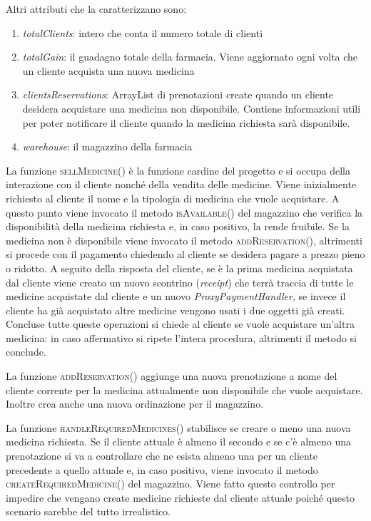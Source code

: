 \documentclass[a4paper, 10pt]{report}
\begin{document}
Altri attributi che la caratterizzano sono:
\begin{enumerate}
\item \textit{totalClients}: intero che conta il numero totale di clienti
\item \textit{totalGain}: il guadagno totale della farmacia. Viene aggiornato ogni volta che un cliente acquista una nuova medicina
\item \textit{clientsReservations}: ArrayList di prenotazioni create quando un cliente desidera acquistare una medicina non disponibile. Contiene informazioni utili per poter notificare il cliente quando la medicina richiesta sarà disponibile.
\item \textit{warehouse}: il magazzino della farmacia
\end{enumerate}
La funzione \textsc{sellMedicine()} è la funzione cardine del progetto e si occupa della interazione con il cliente nonché della vendita delle medicine. Viene inizialmente richiesto al cliente il nome e la tipologia di medicina che vuole acquistare. A questo punto viene invocato il metodo \textsc{isAvailable()} del magazzino che verifica la disponibilità della medicina richiesta e, in caso positivo, la rende fruibile. Se la medicina non è disponibile viene invocato il metodo \textsc{addReservation()}, altrimenti si procede con il pagamento chiedendo al cliente se desidera pagare a prezzo pieno o ridotto. A seguito della risposta del cliente, se è la prima medicina acquistata dal cliente viene creato un nuovo scontrino (\textit{receipt}) che terrà traccia di tutte le medicine acquistate dal cliente e un nuovo \textit{ProxyPaymentHandler}, se invece il cliente ha già acquistato altre medicine vengono usati i due oggetti già creati. Concluse tutte queste operazioni si chiede al cliente se vuole acquistare un'altra medicina: in caso affermativo si ripete l'intera procedura, altrimenti il metodo si conclude.

La funzione \textsc{addReservation()} aggiunge una nuova prenotazione a nome del cliente corrente per la medicina attualmente non disponibile che vuole acquistare. Inoltre crea anche una nuova ordinazione per il magazzino.

La funzione \textsc{handleRequiredMedicines()} stabilisce se creare o meno una nuova medicina richiesta. Se il cliente attuale è almeno il secondo e se c'è almeno una prenotazione si va a controllare che ne esista almeno una per un cliente precedente a quello attuale e, in caso positivo, viene invocato il metodo \textsc{createRequiredMedicine()} del magazzino. Viene fatto questo controllo per impedire che vengano create medicine richieste dal cliente attuale poiché questo scenario sarebbe del tutto irrealistico.
\end{document}

